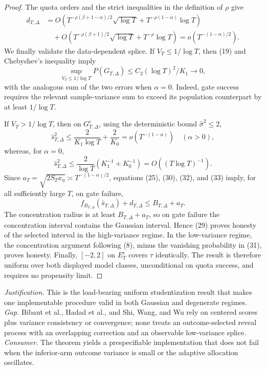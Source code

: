 \documentclass{article}
\begin{document}
\begin{proof}
The quota orders and the strict inequalities in the definition of \(\rho\) give
\[
 \begin{aligned}
 d_{T,\Delta}
 &=O\!\left(T^{-\rho(\beta+1-\alpha)/2}\sqrt{\log T}
 +T^{-\rho(1-\alpha)}\log T\right)\\
 &\quad+O\!\left(T^{-\rho(\beta+1)/2}\sqrt{\log T}
 +T^{-\rho}\log T\right)
 =o(T^{-(1-\alpha)/2}).
 \end{aligned} \tag{30}
\]
We finally validate the data-dependent splice.  If \(V_T\leq1/\log T\), then (19) and Chebyshev's inequality imply
\[
 \sup_{V_T\leq1/\log T}P(G_{T,\Delta})
 \leq C_2(\log T)^2/K_1\longrightarrow0, \tag{31}
\]
with the analogous sum of the two errors when \(\alpha=0\).  Indeed, gate success requires the relevant sample-variance sum to exceed its population counterpart by at least \(1/\log T\).

If \(V_T>1/\log T\), then on \(G_{T,\Delta}^c\), using the deterministic bound \(\widehat\sigma^2\leq2\),
\[
 \widehat s_{T,\Delta}^2
 \leq\frac{2}{K_1\log T}+\frac{2}{K_0}
 =o(T^{-(1-\alpha)})\quad(\alpha>0), \tag{32}
\]
whereas, for \(\alpha=0\),
\[
 \widehat s_{T,\Delta}^2
 \leq\frac{2}{\log T}(K_1^{-1}+K_0^{-1})=O((T\log T)^{-1}). \tag{33}
\]
Since \(a_T=\sqrt{2S_Tx_\eta}\asymp T^{-(1-\alpha)/2}\), equations (25), (30), (32), and (33) imply, for all sufficiently large \(T\), on gate failure,
\[
 f_{B_{T,\Delta}}(\widehat s_{T,\Delta})+d_{T,\Delta}
 \leq B_{T,\Delta}+a_T. \tag{34}
\]
The concentration radius is at least \(B_{T,\Delta}+a_T\), so on gate failure the concentration interval contains the Gaussian interval.  Hence (29) proves honesty of the selected interval in the high-variance regime.  In the low-variance regime, the concentration argument following (8), minus the vanishing probability in (31), proves honesty.  Finally, \([-2,2]\) on \(E_T^c\) covers \(\tau\) identically.  The result is therefore uniform over both displayed model classes, unconditional on quota success, and requires no propensity limit.
\end{proof}
\par\smallskip\noindent \textit{Justification.} This is the load-bearing uniform studentization result that makes one implementable procedure valid in both Gaussian and degenerate regimes. \textit{Gap.} Bibaut et al., Hadad et al., and Shi, Wang, and Wu rely on centered scores plus variance consistency or convergence; none treats an outcome-selected reveal process with an overlapping correction and an observable low-variance splice. \textit{Consumer.} The theorem yields a prespecifiable implementation that does not fail when the inferior-arm outcome variance is small or the adaptive allocation oscillates.
\end{document}
